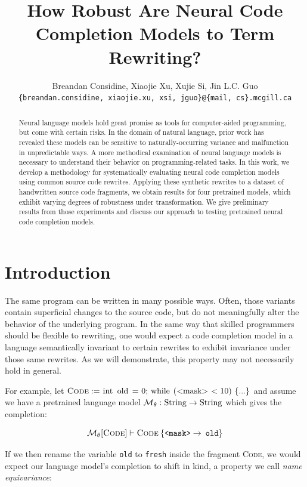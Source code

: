 \documentclass[usenames,dvipsnames]{article} %
\title{How Robust Are Neural Code Completion Models to Term Rewriting?}
\author{Breandan Considine, Xiaojie Xu, Xujie Si, Jin L.C. Guo\\
\texttt{\{breandan.considine, xiaojie.xu, xsi, jguo\}@\{mail, cs\}.mcgill.ca}\\
}
\begin{document}
  \maketitle

  \begin{abstract}
    Neural language models hold great promise as tools for computer-aided programming, but come with certain risks. In the domain of natural language, prior work has revealed these models can be sensitive to naturally-occurring variance and malfunction in unpredictable ways. A more methodical examination of neural language models is necessary to understand their behavior on programming-related tasks. In this work, we develop a methodology for systematically evaluating neural code completion models using common source code rewrites. Applying these synthetic rewrites to a dataset of handwritten source code fragments, we obtain results for four pretrained models, which exhibit varying degrees of robustness under transformation. We give preliminary results from those experiments and discuss our approach to testing pretrained neural code completion models.
  \end{abstract}

  \section{Introduction}\label{sec:introduction}

  The same program can be written in many possible ways. Often, those variants contain superficial changes to the source code, but do not meaningfully alter the behavior of the underlying program. In the same way that skilled programmers should be flexible to rewriting, one would expect a code completion model in a language semantically invariant to certain rewrites to exhibit invariance under those same rewrites. As we will demonstrate, this property may not necessarily hold in general.

  For example, let $\textsc{Code} := \lstinline|int old = 0; while (<mask> < 10) {...}|$ and assume we have a pretrained language model $\mathcal{M}_\theta: \lstinline|String|\rightarrow\lstinline|String|$ which gives the completion:

  \begin{equation}
    \mathcal{M}_\theta[\textsc{Code}] \vdash \textsc{Code}\:\{\texttt{<mask>} \rightarrow \:\texttt{old}\}
  \end{equation}

  If we then rename the variable \texttt{old} to \texttt{fresh} inside the fragment \textsc{Code}, we would expect our language model's completion to shift in kind, a property we call \textit{name equivariance}:
\end{document}
